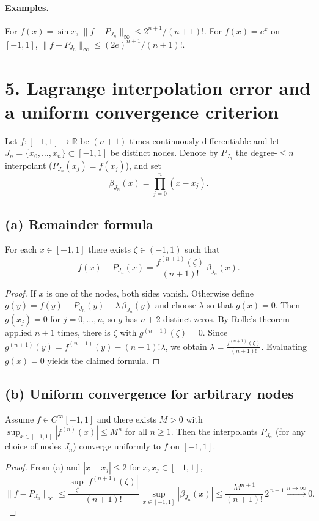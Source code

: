 \documentclass[11pt,a4paper]{article}
\theoremstyle{definition}
\theoremstyle{definition}
\theoremstyle{plain}
\theoremstyle{remark}
\begin{document}
\paragraph{Examples.}
For $f(x)=\sin x$, $\|f-P_{J_n}\|_\infty\le 2^{n+1}/(n+1)!$.
For $f(x)=e^x$ on $[-1,1]$, $\|f-P_{J_n}\|_\infty\le (2e)^{n+1}/(n+1)!$.

\section*{5. Lagrange interpolation error and a uniform convergence criterion}

Let $f:[-1,1]\to\mathbb{R}$ be $(n\!+\!1)$-times continuously differentiable and let
$J_n=\{x_0,\dots,x_n\}\subset[-1,1]$ be distinct nodes. Denote by $P_{J_n}$ the degree-$\le n$
interpolant ($P_{J_n}(x_j)=f(x_j)$), and set
\[
\beta_{J_n}(x)=\prod_{j=0}^{n}(x-x_j).
\]

\subsection*{(a) Remainder formula}
For each $x\in[-1,1]$ there exists $\zeta\in(-1,1)$ such that
\[
f(x)-P_{J_n}(x)=\frac{f^{(n+1)}(\zeta)}{(n+1)!}\,\beta_{J_n}(x).
\]
\begin{proof}
	If $x$ is one of the nodes, both sides vanish. Otherwise define
	$g(y)=f(y)-P_{J_n}(y)-\lambda\,\beta_{J_n}(y)$ and choose $\lambda$ so that $g(x)=0$.
	Then $g(x_j)=0$ for $j=0,\dots,n$, so $g$ has $n\!+\!2$ distinct zeros. By Rolle's theorem
	applied $n\!+\!1$ times, there is $\zeta$ with $g^{(n+1)}(\zeta)=0$. Since
	$g^{(n+1)}(y)=f^{(n+1)}(y)-(n+1)!\lambda$, we obtain
	$\lambda=\frac{f^{(n+1)}(\zeta)}{(n+1)!}$. Evaluating $g(x)=0$ yields the claimed formula.
\end{proof}

\subsection*{(b) Uniform convergence for arbitrary nodes}
Assume $f\in C^\infty[-1,1]$ and there exists $M>0$ with
$\sup_{x\in[-1,1]}|f^{(n)}(x)|\le M^n$ for all $n\ge1$.
Then the interpolants $P_{J_n}$ (for any choice of nodes $J_n$) converge uniformly to $f$ on $[-1,1]$.
\begin{proof}
	From (a) and $|x-x_j|\le2$ for $x,x_j\in[-1,1]$,
	\[
	\|f-P_{J_n}\|_\infty
	\le \frac{\sup_\zeta|f^{(n+1)}(\zeta)|}{(n+1)!}\,\sup_{x\in[-1,1]}|\beta_{J_n}(x)|
	\le \frac{M^{n+1}}{(n+1)!}\,2^{\,n+1}\xrightarrow{n\to\infty}0.
	\]
\end{proof}
\end{document}
